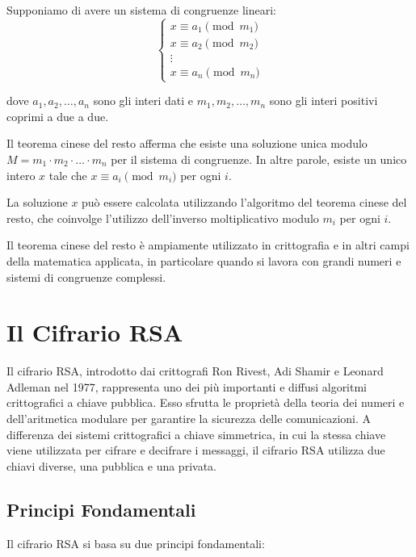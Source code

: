 \documentclass[a4paper,12pt]{report}
\begin{document}
Supponiamo di avere un sistema di congruenze lineari:
\[\begin{cases}
x \equiv a_1 \pmod{m_1} \\
x \equiv a_2 \pmod{m_2} \\
\vdots \\
x \equiv a_n \pmod{m_n}
\end{cases}\]

dove $a_1, a_2, \ldots, a_n$ sono gli interi dati e $m_1, m_2, \ldots, m_n$ sono gli interi positivi coprimi a due a due.

Il teorema cinese del resto afferma che esiste una soluzione unica modulo $M = m_1 \cdot m_2 \cdot \ldots \cdot m_n$ per il sistema di congruenze. In altre parole, esiste un unico intero $x$ tale che $x \equiv a_i \pmod{m_i}$ per ogni $i$.

La soluzione $x$ può essere calcolata utilizzando l'algoritmo del teorema cinese del resto, che coinvolge l'utilizzo dell'inverso moltiplicativo modulo $m_i$ per ogni $i$.

Il teorema cinese del resto è ampiamente utilizzato in crittografia e in altri campi della matematica applicata, in particolare quando si lavora con grandi numeri e sistemi di congruenze complessi.
%
%
%
%
%
%
%
%
%
%
%
%
%
%
%
%
%
%
%
%
%
%
%
%
%
%
%
%
%
%
%
%
%
%
%
%
%
%
%
%
%
\chapter{Il Cifrario RSA}
Il cifrario RSA, introdotto dai crittografi Ron Rivest, Adi Shamir e Leonard Adleman nel 1977, rappresenta uno dei più importanti e diffusi algoritmi crittografici a chiave pubblica. 
Esso sfrutta le proprietà della teoria dei numeri e dell'aritmetica modulare per garantire la sicurezza delle comunicazioni. 
A differenza dei sistemi crittografici a chiave simmetrica, in cui la stessa chiave viene utilizzata per cifrare e decifrare i messaggi, il cifrario RSA utilizza due chiavi diverse, una pubblica e una privata.

\section{Principi Fondamentali}
Il cifrario RSA si basa su due principi fondamentali:
\end{document}
